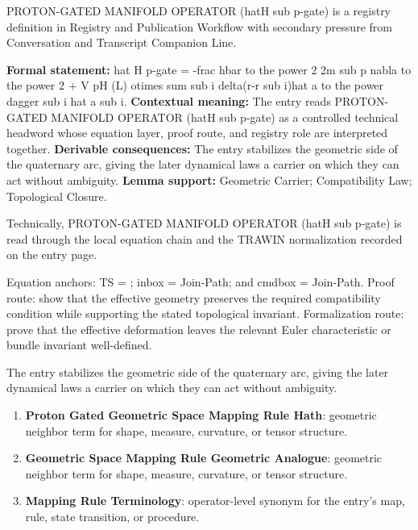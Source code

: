 
\begingroup\small
{}
PROTON-GATED MANIFOLD OPERATOR (hatH sub p-gate) is a registry definition in Registry and Publication Workflow with secondary pressure from Conversation and Transcript Companion Line.

\begingroup\footnotesize\setlength{\emergencystretch}{3em}\sloppy
\textbf{Formal statement:} hat H p-gate = -frac hbar to the power 2 2m sub p nabla to the power 2 + V pH (L) otimes sum sub i delta(r-r sub i)hat a to the power dagger sub i hat a sub i. \textbf{Contextual meaning:} The entry reads PROTON-GATED MANIFOLD OPERATOR (hatH sub p-gate) as a controlled technical headword whose equation layer, proof route, and registry role are interpreted together. \textbf{Derivable consequences:} The entry stabilizes the geometric side of the quaternary arc, giving the later dynamical laws a carrier on which they can act without ambiguity. \textbf{Lemma support:} Geometric Carrier; Compatibility Law; Topological Closure.\par
\endgroup

Technically, PROTON-GATED MANIFOLD OPERATOR (hatH sub p-gate) is read through the local equation chain and the TRAWIN normalization recorded on the entry page.

Equation anchors: TS = ; inbox = Join-Path; and cmdbox = Join-Path. Proof route: show that the effective geometry preserves the required compatibility condition while supporting the stated topological invariant. Formalization route: prove that the effective deformation leaves the relevant Euler characteristic or bundle invariant well-defined.

The entry stabilizes the geometric side of the quaternary arc, giving the later dynamical laws a carrier on which they can act without ambiguity.
\endgroup

\begin{enumerate}[leftmargin=1.6em,itemsep=6pt,topsep=4pt]
\item \textbf{Proton Gated Geometric Space Mapping Rule Hath}: geometric neighbor term for shape, measure, curvature, or tensor structure.
\item \textbf{Geometric Space Mapping Rule Geometric Analogue}: geometric neighbor term for shape, measure, curvature, or tensor structure.
\item \textbf{Mapping Rule Terminology}: operator-level synonym for the entry's map, rule, state transition, or procedure.
\end{enumerate}

